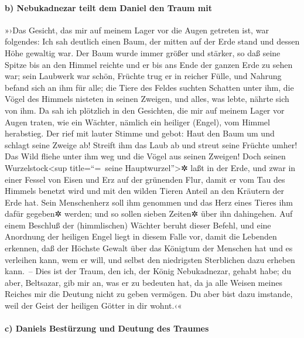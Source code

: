\hypertarget{b-nebukadnezar-teilt-dem-daniel-den-traum-mit}{%
\paragraph{b) Nebukadnezar teilt dem Daniel den Traum
mit}\label{b-nebukadnezar-teilt-dem-daniel-den-traum-mit}}

»›Das Gesicht, das mir auf meinem Lager vor die Augen
getreten ist, war folgendes: Ich sah deutlich einen Baum, der mitten auf
der Erde stand und dessen Höhe gewaltig war. Der Baum
wurde immer größer und stärker, so daß seine Spitze bis an den Himmel
reichte und er bis ans Ende der ganzen Erde zu sehen war;
sein Laubwerk war schön, Früchte trug er in reicher Fülle,
und Nahrung befand sich an ihm für alle; die Tiere des Feldes suchten
Schatten unter ihm, die Vögel des Himmels nisteten in seinen Zweigen,
und alles, was lebte, nährte sich von ihm. Da sah ich
plötzlich in den Gesichten, die mir auf meinem Lager vor Augen traten,
wie ein Wächter, nämlich ein heiliger (Engel), vom Himmel herabstieg.
Der rief mit lauter Stimme und gebot: Haut den Baum um
und schlagt seine Zweige ab! Streift ihm das Laub ab und streut seine
Früchte umher! Das Wild fliehe unter ihm weg und die Vögel aus seinen
Zweigen! Doch seinen Wurzelstock\textless sup
title=``=~seine Hauptwurzel''\textgreater✲ laßt in der Erde, und zwar in
einer Fessel von Eisen und Erz auf der grünenden Flur, damit er vom Tau
des Himmels benetzt wird und mit den wilden Tieren Anteil an den
Kräutern der Erde hat. Sein Menschenherz soll ihm
genommen und das Herz eines Tieres ihm dafür gegeben✲ werden; und so
sollen sieben Zeiten✲ über ihn dahingehen. Auf einem
Beschluß der (himmlischen) Wächter beruht dieser Befehl, und eine
Anordnung der heiligen Engel liegt in diesem Falle vor, damit die
Lebenden erkennen, daß der Höchste Gewalt über das Königtum der Menschen
hat und es verleihen kann, wem er will, und selbst den niedrigsten
Sterblichen dazu erheben kann.~-- Dies ist der Traum, den
ich, der König Nebukadnezar, gehabt habe; du aber, Beltsazar, gib mir
an, was er zu bedeuten hat, da ja alle Weisen meines Reiches mir die
Deutung nicht zu geben vermögen. Du aber bist dazu imstande, weil der
Geist der heiligen Götter in dir wohnt.‹«

\hypertarget{c-daniels-bestuxfcrzung-und-deutung-des-traumes}{%
\paragraph{c) Daniels Bestürzung und Deutung des
Traumes}\label{c-daniels-bestuxfcrzung-und-deutung-des-traumes}}

